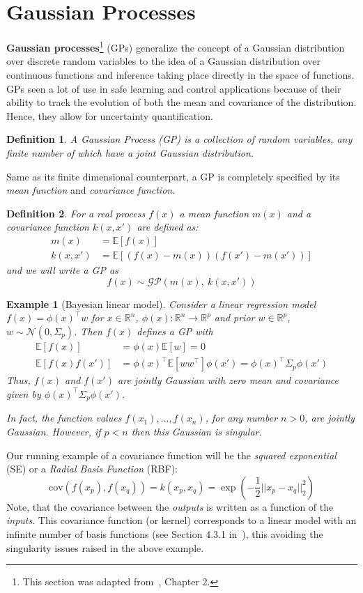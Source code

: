 \documentclass{article}[12pt]
\def\E{\E}
\def \E{\mathbb E}
\newcommand{\cov}{\mathrm{cov}}
\newtheorem{definition}{Definition}
\newtheorem{example}{Example}
\begin{document}
\section{Gaussian Processes}
\textbf{Gaussian processes}\footnote{This section was adapted from~\cite{rasmussen:williams:2006}, Chapter 2.} (GPs) generalize the concept of a Gaussian distribution over discrete random variables to the
idea of a Gaussian distribution over continuous functions and inference taking place directly in the space of functions.
GPs seen a lot of use in safe learning and control applications because of their ability to track the evolution of both the mean and covariance of the distribution. Hence, they allow for uncertainty quantification. 
\begin{definition}
A Gaussian Process (GP) is a collection of random variables, any
finite number of which have a joint Gaussian distribution.
\end{definition}
Same as its finite dimensional counterpart, a GP is completely specified by its \textit{mean function} and \textit{covariance function}.
\begin{definition}
For a real process $f(x)$ a mean function $m(x)$ and a covariance function $k(x,x')$ are defined as:
\begin{align*}
m(x)&= \E[f(x)]\\
k(x,x')& = \E\left[(f(x)-m(x))(f(x')-m(x'))\right]
\end{align*} 
and we will write a GP as
\begin{equation}
\label{eq:gp}
f(x)\sim \mathcal{GP}(m(x),\ k(x,x')) 
\end{equation}
\end{definition}
\begin{example}[Bayesian linear model]
Consider a linear regression model $f(x)=\phi(x)^\top w$ for $x\in\mathbb{R}^n$, $\phi(x):\mathbb{R}^n\to \mathbb{R}^p$ and prior $w\in\mathbb{R}^p$, $w\sim\mathcal{N}(0,\Sigma_p)$. Then $f(x)$ defines a GP with
\begin{align*}
\E[f(x)]&= \phi(x)\E[w]=0\\
\E [f(x)f(x')]&= \phi(x)^\top \E[ww^\top] \phi(x') = 
\phi(x)^\top \Sigma_p \phi(x')
\end{align*}
Thus, $f(x)$ and $f(x')$ are jointly Gaussian with zero mean and covariance given by $\phi(x)^\top \Sigma_p \phi(x')$.

In fact, the function values $f(x_1),\ldots,f(x_n)$, for any number $n>0$, are jointly Gaussian. However, if $p<n$ then this Gaussian is singular. 
\end{example}
Our running example of a covariance function will be the \textit{squared exponential} (SE) or a \textit{Radial Basis Function} (RBF):
\begin{equation}
\label{eq:cov_free}
\cov(f(x_p),f(x_q))= k(x_p,x_q)=\exp\left(-\frac{1}{2}||x_p-x_q||_2^2\right)
\end{equation}
Note, that the covariance between the \textit{outputs} is written as a function of the
\textit{inputs}. 
This covariance function (or kernel) corresponds to a linear model with an infinite number of basis functions (see Section 4.3.1 in~\cite{rasmussen:williams:2006}), this avoiding the singularity issues raised in the above example. 
\end{document}
